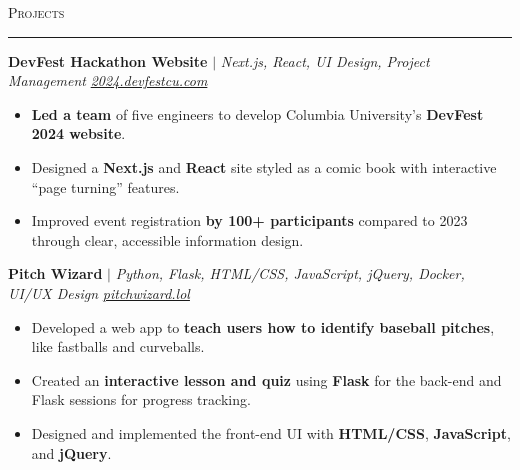 \documentclass[11pt,letterpaper]{article}
\begin{document}
\vspace{4pt}
\textsc{\large{Projects}} 
\vspace{4pt}
\hrule
\begin{list}{}{\setlength{\leftmargin}{1em}\setlength{\rightmargin}{2pt}}
  
    \item
        \small{\textbf{DevFest Hackathon Website}} $|$ \small{\textit{Next.js, React, UI Design, Project Management}} \hfill \small{\textit{\href{https://2024.devfestcu.com/}{2024.devfestcu.com}}}
          \begin{itemize}[itemsep=-5pt, topsep=-2pt]
              \item \textbf{Led a team} of five engineers to develop Columbia University's \textbf{DevFest 2024 website}.
              \item Designed a \textbf{Next.js} and \textbf{React} site styled as a comic book with interactive ``page turning'' features.
              \item Improved event registration \textbf{by 100+ participants} compared to 2023 through clear, accessible information design.
          \end{itemize}
          \vspace{4pt}

    \item
        \small{\textbf{Pitch Wizard}} $|$ \small{\textit{Python, Flask, HTML/CSS, JavaScript, jQuery, Docker, UI/UX Design}} \hfill \small{\textit{\href{https://pitchwizard.lol/}{pitchwizard.lol}}}
          \begin{itemize}[itemsep=-5pt, topsep=-2pt]
              \item Developed a web app to \textbf{teach users how to identify baseball pitches}, like fastballs and curveballs.
              \item Created an \textbf{interactive lesson and quiz} using \textbf{Flask} for the back-end and Flask sessions for progress tracking.
              \item Designed and implemented the front-end UI with \textbf{HTML/CSS}, \textbf{JavaScript}, and \textbf{jQuery}.
          \end{itemize}
          \vspace{4pt}
    

\end{list}
\end{document}
